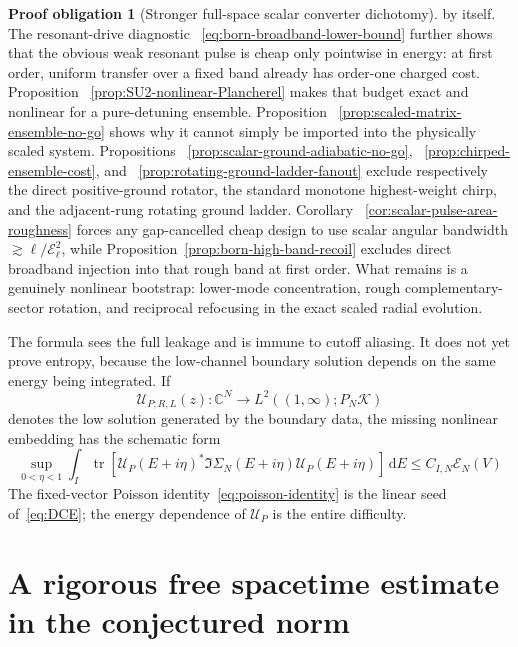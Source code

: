 \documentclass[11pt]{article}
\newcommand{\C}{\mathbb C}
\newcommand{\K}{\mathcal K}
\newcommand{\cE}{\mathcal E}
\newcommand{\dd}{\,\mathrm d}
\DeclareMathOperator{\tr}{tr}
\theoremstyle{definition}
\newtheorem{problem}[theorem]{Proof obligation}
\theoremstyle{remark}
\begin{document}
\begin{problem}[Stronger full-space scalar converter dichotomy]
 by itself.  The resonant-drive diagnostic
 ~\eqref{eq:born-broadband-lower-bound} further shows that the obvious weak
 resonant pulse is cheap only pointwise in energy: at first order, uniform
 transfer over a fixed band already has order-one charged cost.  Proposition
 ~\ref{prop:SU2-nonlinear-Plancherel} makes that budget exact and nonlinear for
 a pure-detuning ensemble.  Proposition
 ~\ref{prop:scaled-matrix-ensemble-no-go} shows why it cannot simply be imported
 into the physically scaled system.  Propositions
 ~\ref{prop:scalar-ground-adiabatic-no-go},
 ~\ref{prop:chirped-ensemble-cost}, and
 ~\ref{prop:rotating-ground-ladder-fanout} exclude respectively the direct
 positive-ground rotator, the standard monotone highest-weight chirp, and the
 adjacent-rung rotating ground ladder.  Corollary
 ~\ref{cor:scalar-pulse-area-roughness} forces any gap-cancelled cheap design
 to use scalar angular bandwidth $\gtrsim\ell/\mathcal E_\ell^2$, while
 Proposition~\ref{prop:born-high-band-recoil} excludes direct broadband
 injection into that rough band at first order.  What remains is a genuinely
 nonlinear bootstrap: lower-mode concentration, rough complementary-sector
 rotation, and reciprocal refocusing in the exact scaled radial evolution.
\end{problem}

The formula sees the full leakage and is immune to cutoff aliasing.  It does not yet prove entropy, because the low-channel boundary solution depends on the same energy being integrated.  If
\begin{equation}
 \mathcal U_{P;R,L}(z):\C^N\longrightarrow L^2((1,\infty);P_N\K)
 \label{eq:dressed-solution-map}
\end{equation}
denotes the low solution generated by the boundary data, the missing nonlinear embedding has the schematic form
\begin{equation}
 \sup_{0<\eta<1}\int_I
 \tr\!\left[
 \mathcal U_P(E+i\eta)^*\Im\Sigma_N(E+i\eta)\mathcal U_P(E+i\eta)
 \right]\dd E
 \leq C_{I,N}\cE_N(V)
 \label{eq:DCE}
\end{equation}
The fixed-vector Poisson identity~\eqref{eq:poisson-identity} is the linear seed of~\eqref{eq:DCE}; the energy dependence of $\mathcal U_P$ is the entire difficulty.

\section{A rigorous free spacetime estimate in the conjectured norm}
\end{document}
